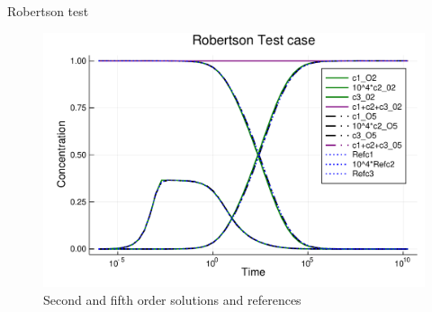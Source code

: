\documentclass[9pt,compress,t,aspectratio=169]{beamer}
\newcommand{\1}{\begin{pmatrix}
                 1\\
                 1
                \end{pmatrix}}
\begin{document}
\begin{frame}{Robertson test}
\begin{figure}[!htp]
\center
    \includegraphics[height=0.7\textheight]{images/RobertsonOrder25.pdf}
  \caption{ Second and fifth order solutions and references 
 }
  \label{fig:Robertson}
\end{figure}

\end{frame}
\end{document}
